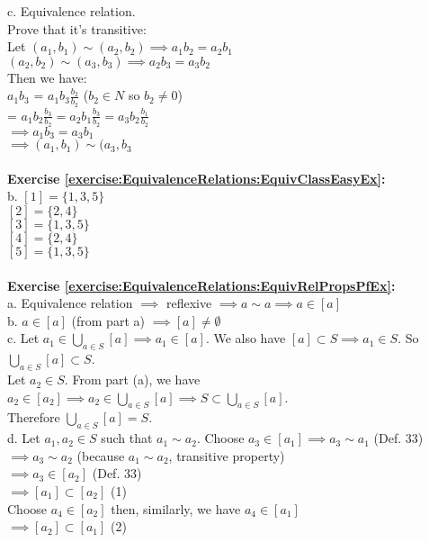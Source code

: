 c. Equivalence relation.\\
Prove that it's transitive:\\
Let $(a_1,b_1)\sim (a_2,b_2) \implies a_1b_2=a_2b_1$\\
    $(a_2,b_2)\sim (a_3,b_3) \implies a_2b_3=a_3b_2$\\
Then we have:\\
$a_1b_3$ = $a_1b_3\displaystyle\frac{b_2}{b_2}$ ($b_2\in N$ so $b_2\neq 0$)\\
= $a_1b_2\displaystyle\frac{b_3}{b_2}=a_2b_1\displaystyle\frac{b_3}{b_2}=a_3b_2\displaystyle\frac{b_1}{b_2}$\\
$\implies a_1b_3=a_3b_1$\\
$\implies (a_1,b_1)\sim (a_3,b_3$\\
\\
\textbf{Exercise \ref{exercise:EquivalenceRelations:EquivClassEasyEx}:}\\
b. $[1]=\{1,3,5\}$\\
$[2]=\{2,4\}$\\
$[3]=\{1,3,5\}$\\
$[4]=\{2,4\}$\\
$[5]=\{1,3,5\}$\\
\\
\textbf{Exercise \ref{exercise:EquivalenceRelations:EquivRelPropsPfEx}:}\\
a. Equivalence relation $\implies$  reflexive $\implies a \sim a \implies a\in[a]$\\
b. $a\in [a]$ (from part a) $\implies [a]\neq \emptyset$\\
c. Let $a_1\in \bigcup_{a\in S}[a] \implies a_1\in [a]$. We also have $[a]\subset S \implies a_1\in S$. So $\bigcup_{a\in S}[a]\subset S$.\\
Let $a_2 \in S$. From part (a), we have $a_2 \in [a_2] \implies a_2\in\bigcup_{a\in S}[a] \implies S\subset \bigcup_{a\in S}[a]$.\\
Therefore $\bigcup_{a\in S}[a]=S$.\\
d. Let $a_1,a_2 \in S$ such that $a_1 \sim a_2$. Choose $a_3\in[a_1] \implies a_3 \sim a_1$ (Def. 33)\\
$\implies a_3 \sim a_2$ (because $a_1 \sim a_2$, transitive property)\\
$\implies a_3 \in [a_2]$ (Def. 33)\\
$\implies [a_1]\subset[a_2]$ (1)\\
Choose $a_4\in[a_2]$ then, similarly, we have $a_4\in[a_1]$\\
$\implies [a_2]\subset[a_1]$ (2)\\
